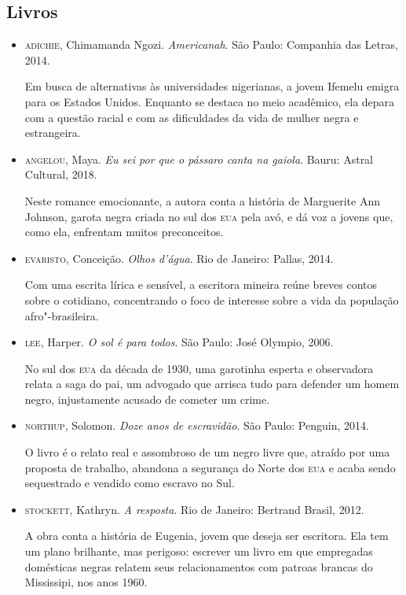 \documentclass[11pt]{extarticle}
\begin{document}
\subsection{Livros}
\begin{itemize}
\item\textsc{adichie}, Chimamanda Ngozi. \textit{Americanah}. São Paulo: Companhia
  das Letras, 2014.

Em busca de alternativas às universidades nigerianas, a jovem Ifemelu
emigra para os Estados Unidos. Enquanto se destaca no meio acadêmico,
ela depara com a questão racial e com as dificuldades da vida de mulher
negra e estrangeira.

\item\textsc{angelou}, Maya. \textit{Eu sei por que o pássaro canta na gaiola}.
  Bauru: Astral Cultural, 2018.

Neste romance emocionante, a autora conta a história de Marguerite Ann
Johnson, garota negra criada no sul dos \textsc{eua} pela avó, e dá voz a jovens
que, como ela, enfrentam muitos preconceitos.

\item\textsc{evaristo}, Conceição. \textit{Olhos d'água}. Rio de Janeiro: Pallas,
  2014.

Com uma escrita lírica e sensível, a escritora mineira reúne breves
contos sobre o cotidiano, concentrando o foco de interesse sobre a vida
da população afro"-brasileira.

\item\textsc{lee}, Harper. \textit{O sol é para todos}. São Paulo: José Olympio,
  2006.

No sul dos \textsc{eua} da década de 1930, uma garotinha esperta e observadora
relata a saga do pai, um advogado que arrisca tudo para defender um
homem negro, injustamente acusado de cometer um crime.

\item\textsc{northup}, Solomon. \textit{Doze anos de escravidão}. São Paulo:
  Penguin, 2014.

O livro é o relato real e assombroso de um negro livre que, atraído por
uma proposta de trabalho, abandona a segurança do Norte dos \textsc{eua} e acaba
sendo sequestrado e vendido como escravo no Sul.

\item\textsc{stockett}, Kathryn. \textit{A resposta}. Rio de Janeiro: Bertrand
  Brasil, 2012.

A obra conta a história de Eugenia, jovem que deseja ser escritora. Ela
tem um plano brilhante, mas perigoso: escrever um livro em que
empregadas domésticas negras relatem seus relacionamentos com patroas
brancas do Mississipi, nos anos 1960.


\end{itemize}
\end{document}
